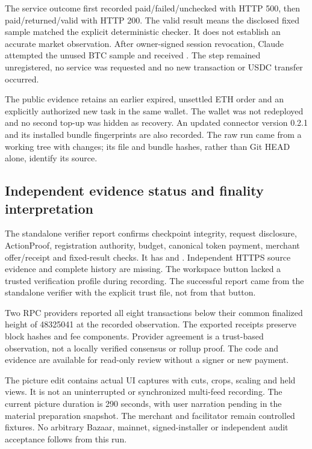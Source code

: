 The service outcome first recorded paid/failed/unchecked with HTTP 500, then paid/returned/valid with HTTP 200. The valid result means the disclosed fixed sample matched the explicit deterministic checker. It does not establish an accurate market observation. After owner-signed session revocation, Claude attempted the unused BTC sample and received . The step remained unregistered, no service was requested and no new transaction or USDC transfer occurred.

The public evidence retains an earlier expired, unsettled ETH order and an explicitly authorized new task in the same wallet. The wallet was not redeployed and no second top-up was hidden as recovery. An updated connector version 0.2.1 and its installed bundle fingerprints are also recorded. The raw run came from a working tree with changes; its file and bundle hashes, rather than Git HEAD alone, identify its source.

\subsection{Independent evidence status and finality interpretation}
The standalone verifier report confirms checkpoint integrity, request disclosure, ActionProof, registration authority, budget, canonical token payment, merchant offer/receipt and fixed-result checks. It has  and . Independent HTTPS source evidence and complete history are missing. The workspace button lacked a trusted verification profile during recording. The successful report came from the standalone verifier with the explicit trust file, not from that button.

Two RPC providers reported all eight transactions below their common finalized height of 48325041 at the recorded observation. The exported receipts preserve block hashes and fee components. Provider agreement is a trust-based observation, not a locally verified consensus or rollup proof. The code and evidence are available for read-only review without a signer or new payment.

The picture edit contains actual UI captures with cuts, crops, scaling and held views. It is not an uninterrupted or synchronized multi-feed recording. The current picture duration is 290 seconds, with user narration pending in the material preparation snapshot. The merchant and facilitator remain controlled fixtures. No arbitrary Bazaar, mainnet, signed-installer or independent audit acceptance follows from this run.
